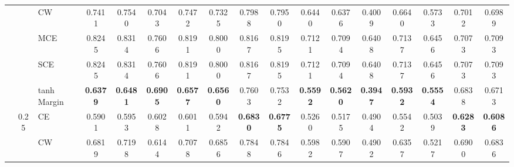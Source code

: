 \documentclass[sigconf,authordraft]{acmart}
\begin{document}
\begin{table*}
{\begin{tabular}{lcl|ccccccc|ccccccc}
                                 &      & CW &                  0.7411 &                  0.7540 &              0.7043 &                  0.7472 &           0.7325 &                       0.7988 &                       0.7950 &                  0.6440 &                  0.6376 &              0.4009 &                  0.6640 &           0.5733 &                       0.7012 &                       0.6989 \\
                                 &      & MCE &                  0.8245 &                  0.8314 &              0.7606 &                  0.8191 &           0.8000 &                       0.8167 &                       0.8195 &                  0.7121 &                  0.7094 &              0.6408 &                  0.7137 &           0.6456 &                       0.7073 &                       0.7093 \\
                                 &      & SCE &                  0.8245 &                  0.8314 &              0.7606 &                  0.8191 &           0.8000 &                       0.8167 &                       0.8195 &                  0.7121 &                  0.7094 &              0.6408 &                  0.7137 &           0.6456 &                       0.7073 &                       0.7093 \\
                                 &      & tanh Margin &         \textbf{0.6379} &         \textbf{0.6481} &     \textbf{0.6905} &         \textbf{0.6577} &  \textbf{0.6560} &                       0.7603 &                       0.7532 &         \textbf{0.5592} &         \textbf{0.5620} &     \textbf{0.3947} &         \textbf{0.5932} &  \textbf{0.5554} &                       0.6838 &                       0.6713 \\
    \cline{2-17}
                                 & \multirow{5}{*}{0.25} & CE &                  0.5901 &                  0.5953 &              0.6028 &                  0.6011 &           0.5942 &              \textbf{0.6830} &              \textbf{0.6775} &                  0.5260 &                  0.5175 &              0.4904 &                  0.5542 &           0.5039 &              \textbf{0.6283} &              \textbf{0.6086} \\
                                 &      & CW &                  0.6819 &                  0.7198 &              0.6144 &                  0.7078 &           0.6856 &                       0.7848 &                       0.7846 &                  0.5982 &                  0.5907 &              0.4902 &                  0.6357 &           0.5217 &                       0.6900 &                       0.6836 \\

\end{tabular}}
\end{table*}
\end{document}
